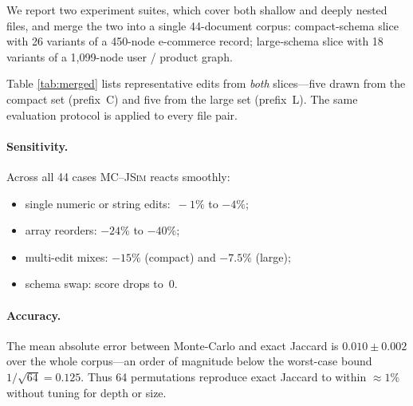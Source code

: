 \documentclass[sigconf]{acmart}
\begin{document}
We report two experiment suites, which cover both shallow and deeply nested files, and merge the two into a single 44-document corpus: compact‐schema slice with 26 variants of a 450-node e-commerce record; large‐schema slice with 18 variants of a 1,099-node user / product graph.

Table \ref{tab:merged} lists representative edits from \emph{both}
slices—five drawn from the compact set (prefix~C) and five from the
large set (prefix~L).  The same evaluation protocol is applied to every
file pair.

\paragraph*{Sensitivity.}
Across all 44 cases \textsc{MC--JSim} reacts smoothly:

\begin{itemize}
\item single numeric or string edits: \( \,{-}1\%\) to \( {-}4\% \);
\item array reorders: \( {-}24\%\) to \( {-}40\%\);
\item multi-edit mixes: \( {-}15\%\) (compact) and \( {-}7.5\%\) (large);
\item schema swap: score drops to~0.
\end{itemize}

\paragraph*{Accuracy.}
The mean absolute error between Monte-Carlo and exact
Jaccard is \(0.010 \pm 0.002\) over the whole corpus—an order of
magnitude below the worst-case bound
\(1/\!\sqrt{64}=0.125\).
Thus 64 permutations reproduce exact Jaccard to within \(\approx1\%\)
without tuning for depth or size.
\end{document}
